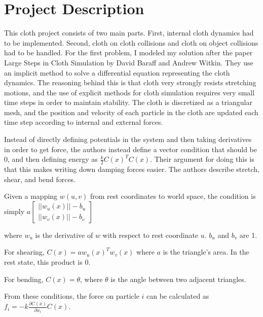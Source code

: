 \documentclass[12pt]{article} %
\begin{document}

\section{Project Description} %

	This cloth project consists of two main parts. First, internal cloth dynamics had to be implemented. Second, cloth on cloth collisions and cloth on object collisions had to be handled. For the first problem, I modeled my solution after the paper Large Steps in Cloth Simulation by David Baraff and Andrew Witkin. They use an implicit method to solve a differential equation representing the cloth dynamics. The reasoning behind this is that cloth very strongly resists stretching motions, and the use of explicit methods for cloth simulation requires very small time steps in order to maintain stability. The cloth is discretized as a triangular mesh, and the position and velocity of each particle in the cloth are updated each time step according to internal and external forces.

	Instead of directly defining potentials in the system and then taking derivatives in order to get force, the authors instead define a vector condition that should be 0, and then defining energy as $\frac{k}{2}C(x)^TC(x)$. Their argument for doing this is that this makes writing down damping forces easier. The authors describe stretch, shear, and bend forces. 

	Given a mapping $w(u,v)$ from rest coordinates to world space, the condition is simply $a\begin{bmatrix}
	||w_u(x)|| - b_u \\
	||w_v(x)|| - b_v
	\end{bmatrix}
$

where $w_u$ is the derivative of $w$ with respect to rest coordinate $u$. $b_u$ and $b_v$ are 1.

For shearing, $C(x) = a w_u(x)^T w_v(x)$ where $a$ is the triangle's area. In the rest state, this product is 0. 

For bending, $C(x) = \theta$, where $\theta$ is the angle between two adjacent triangles.
	
From these conditions, the force on particle $i$ can be calculated as $f_i = -k \frac{\partial C(x)}{\partial x_i} C(x).$
\end{document}
